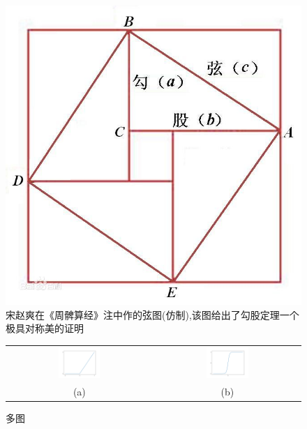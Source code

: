 \documentclass[UTF8,a4paper,8pt,no-math]{article} %
\numberwithin{equation}{section} %
\begin{document}
\begin{figure}[ht]%
	\centering     %
	\includegraphics[scale=0.2]{xiantu.jpg} %
	\caption{\kaishu 宋赵爽在《周髀算经》注中作的弦图(仿制),该图给出了勾股定理一个极具对称美的证明}%
	\label{fig:xiantu}  %
\end{figure}

\begin{figure}[htbp]
	\begin{center}
		\begin{tabular}{cc}
			\includegraphics[width=0.3\textwidth]{relu.png} &
			\includegraphics[width=0.3\textwidth]{tanh.png}       \\
			(a)                                             & (b)
		\end{tabular}
	\end{center}
	\caption{多图}
\end{figure}
\end{document}
